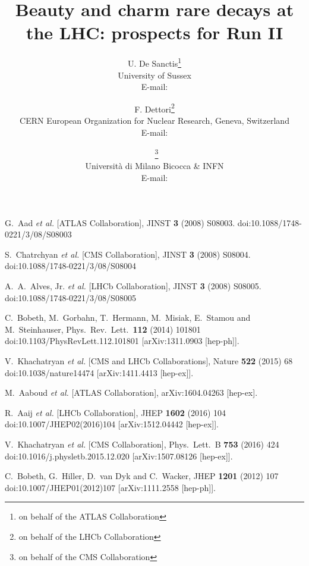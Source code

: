 \documentclass{PoS}
\title{Beauty and charm rare decays at the LHC: prospects for Run II}
\author{U. De Sanctis\thanks{on behalf of the ATLAS Collaboration}\\
        University of Sussex\\
        E-mail: \email{umberto.de.sanctis@cern.ch}\\}
\author{F. Dettori\thanks{on behalf of the LHCb Collaboration}\\
        CERN European Organization for Nuclear Research, Geneva, Switzerland\\
        E-mail: \email{francesco.dettori@cern.ch}\\ }
\author{\speaker{S. Fiorendi}~\thanks{on behalf of the CMS Collaboration}\\
       Universit\`a di Milano Bicocca \& INFN\\
        E-mail: \email{sara.fiorendi@cern.ch}
	}
\begin{document}






\begin{thebibliography}{99}
   G.~Aad {\it et al.} [ATLAS Collaboration],
  JINST {\bf 3} (2008) S08003.
  doi:10.1088/1748-0221/3/08/S08003

   S.~Chatrchyan {\it et al.} [CMS Collaboration],
  JINST {\bf 3} (2008) S08004.
  doi:10.1088/1748-0221/3/08/S08004

  A.~A.~Alves, Jr. {\it et al.} [LHCb Collaboration],
  JINST {\bf 3} (2008) S08005.
  doi:10.1088/1748-0221/3/08/S08005
  
  C.~Bobeth, M.~Gorbahn, T.~Hermann, M.~Misiak, E.~Stamou and M.~Steinhauser,
  Phys.\ Rev.\ Lett.\  {\bf 112} (2014) 101801
  doi:10.1103/PhysRevLett.112.101801
  [arXiv:1311.0903 [hep-ph]].
  
  V.~Khachatryan {\it et al.} [CMS and LHCb Collaborations],
  Nature {\bf 522} (2015) 68
  doi:10.1038/nature14474
  [arXiv:1411.4413 [hep-ex]].

  M.~Aaboud {\it et al.} [ATLAS Collaboration],
  arXiv:1604.04263 [hep-ex].

  R.~Aaij {\it et al.} [LHCb Collaboration],
  JHEP {\bf 1602} (2016) 104
  doi:10.1007/JHEP02(2016)104
  [arXiv:1512.04442 [hep-ex]].

  V.~Khachatryan {\it et al.} [CMS Collaboration],
  Phys.\ Lett.\ B {\bf 753} (2016) 424
  doi:10.1016/j.physletb.2015.12.020
  [arXiv:1507.08126 [hep-ex]].

  C.~Bobeth, G.~Hiller, D.~van Dyk and C.~Wacker,
  JHEP {\bf 1201} (2012) 107
  doi:10.1007/JHEP01(2012)107
  [arXiv:1111.2558 [hep-ph]].


\end{thebibliography}
\end{document}
